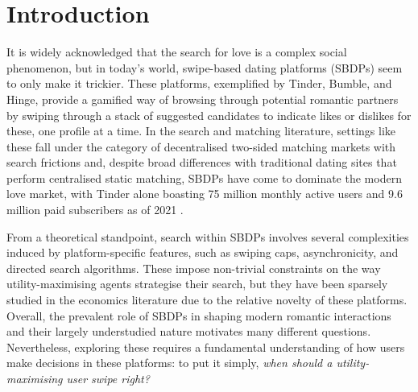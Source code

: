 \section{Introduction}
\label{sec:section1}
It is widely acknowledged that the search for love is a complex social phenomenon, but in today's world, swipe-based dating platforms (SBDPs) seem to only make it trickier.
These platforms, exemplified by Tinder, Bumble, and Hinge, provide a gamified way of browsing through potential romantic partners by swiping through a stack of suggested candidates to indicate likes or dislikes for these, one profile at a time.  
In the search and matching literature, settings like these fall under the category of decentralised two-sided matching markets with search frictions \citep{kanoria2021facilitating} and, despite broad differences with traditional dating sites that perform centralised static matching, SBDPs have come to dominate the modern love market, with Tinder alone boasting 75 million monthly active users and 9.6 million paid subscribers as of 2021 \citep{web:tinder_stats}.

From a theoretical standpoint, search within SBDPs involves several complexities induced by platform-specific features, such as swiping caps, asynchronicity, and directed search algorithms.
These impose non-trivial constraints on the way utility-maximising agents strategise their search, but they have been sparsely studied in the economics literature due to the relative novelty of these platforms.
Overall, the prevalent role of SBDPs in shaping modern romantic interactions and their largely understudied nature motivates many different questions.
Nevertheless, exploring these requires a fundamental understanding of how users make decisions in these platforms: to put it simply, \textit{when should a utility-maximising user swipe right?}

